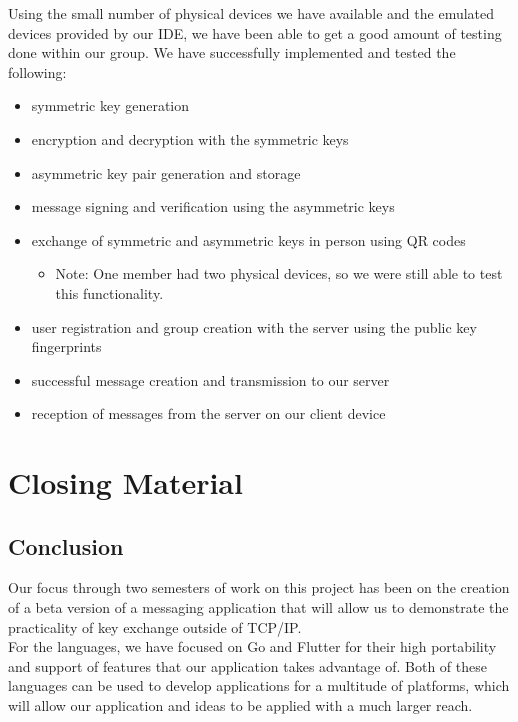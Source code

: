\documentclass[11pt]{article}
\begin{document}
Using the small number of physical devices we have available and the emulated devices provided by our IDE, we have been able to get a good amount of testing done within our group. We have successfully implemented and tested the following:
    \begin{itemize}
        \item {symmetric key generation}
        \item {encryption and decryption with the symmetric keys}
        \item {asymmetric key pair generation and storage}
        \item {message signing and verification using the asymmetric keys}
        \item {exchange of symmetric and asymmetric keys in person using QR codes}
        \begin{itemize}
            \item {Note: One member had two physical devices, so we were still able to test this functionality.}
        \end{itemize}
        \item {user registration and group creation with the server using the public key fingerprints}
        \item {successful message creation and transmission to our server}
        \item {reception of messages from the server on our client device}
    \end{itemize}


\newpage
\section{Closing Material}
\subsection{Conclusion}

Our focus through two semesters of work on this project has been on the creation of a beta version of a messaging application that will allow us to demonstrate the practicality of key exchange outside of TCP/IP.  \\

For the languages, we have focused on Go and Flutter for their high portability and support of features that our application takes advantage of. Both of these languages can be used to develop applications for a multitude of platforms, which will allow our application and ideas to be applied with a much larger reach. \\
\end{document}

